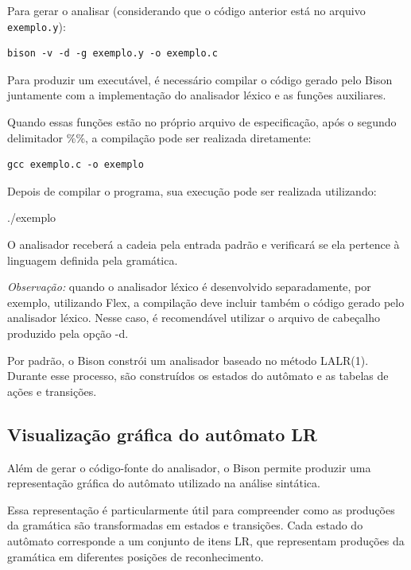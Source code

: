 \documentclass[
  brazilian,
  letterpaper,
]{book}
\newenvironment{Shaded}{\begin{snugshade}}{\end{snugshade}}
\newcommand{\NormalTok}[1]{\textcolor[rgb]{0.00,0.23,0.31}{#1}}
\newcommand{\OperatorTok}[1]{\textcolor[rgb]{0.37,0.37,0.37}{#1}}
\theoremstyle{plain}
\theoremstyle{definition}
\theoremstyle{remark}
\begin{document}
Para gerar o analisar (considerando que o código anterior está no
arquivo \texttt{exemplo.y}):

\begin{verbatim}
bison -v -d -g exemplo.y -o exemplo.c
\end{verbatim}

Para produzir um executável, é necessário compilar o código gerado pelo
Bison juntamente com a implementação do analisador léxico e as funções
auxiliares.

Quando essas funções estão no próprio arquivo de especificação, após o
segundo delimitador \%\%, a compilação pode ser realizada diretamente:

\begin{verbatim}
gcc exemplo.c -o exemplo
\end{verbatim}

Depois de compilar o programa, sua execução pode ser realizada
utilizando:

\begin{Shaded}
\begin{Highlighting}[]
\OperatorTok{./}\NormalTok{exemplo}
\end{Highlighting}
\end{Shaded}

O analisador receberá a cadeia pela entrada padrão e verificará se ela
pertence à linguagem definida pela gramática.

\emph{Observação:} quando o analisador léxico é desenvolvido
separadamente, por exemplo, utilizando Flex, a compilação deve incluir
também o código gerado pelo analisador léxico. Nesse caso, é
recomendável utilizar o arquivo de cabeçalho produzido pela opção -d.

Por padrão, o Bison constrói um analisador baseado no método LALR(1).
Durante esse processo, são construídos os estados do autômato e as
tabelas de ações e transições.

\subsection{Visualização gráfica do autômato
LR}\label{visualizauxe7uxe3o-gruxe1fica-do-autuxf4mato-lr}

Além de gerar o código-fonte do analisador, o Bison permite produzir uma
representação gráfica do autômato utilizado na análise sintática.

Essa representação é particularmente útil para compreender como as
produções da gramática são transformadas em estados e transições. Cada
estado do autômato corresponde a um conjunto de itens LR, que
representam produções da gramática em diferentes posições de
reconhecimento.
\end{document}
